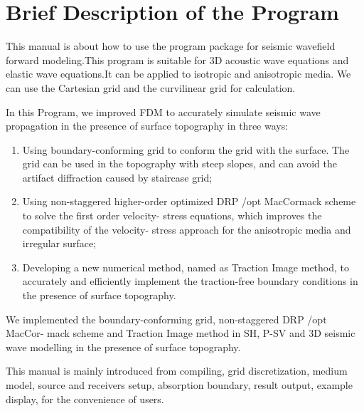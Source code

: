\chapter{Brief Description of the Program}\label{chap_intro}

This manual is about how to use the program package for seismic wavefield forward modeling.This program is suitable for 3D acoustic wave equations and elastic wave equations.It can be applied to isotropic and anisotropic media. We can use the Cartesian grid and the curvilinear grid for calculation.

In this Program, we improved FDM to accurately simulate seismic wave propagation in the presence of surface topography in three ways: 
	\begin{enumerate}
	\item Using boundary-conforming grid to conform the grid with the surface. The grid can be used in the topography with steep slopes, and can avoid the artifact diffraction caused by staircase grid; 
	\item Using non-staggered higher-order optimized DRP /opt MacCormack scheme to solve the first order velocity- stress equations, which improves the compatibility of the velocity- stress approach for the anisotropic media and irregular surface;
	\item Developing a new numerical method, named as Traction Image method, to accurately and efficiently implement the traction-free boundary conditions in the presence of surface topography.  
	\end{enumerate}
We implemented the boundary-conforming grid, non-staggered DRP /opt MacCor- mack scheme and Traction Image method in SH, P-SV and 3D seismic wave modelling in the presence of surface topography.

This manual is mainly introduced from compiling, grid discretization, medium model, source and receivers setup, absorption boundary, result output, example display, for the convenience of users.
